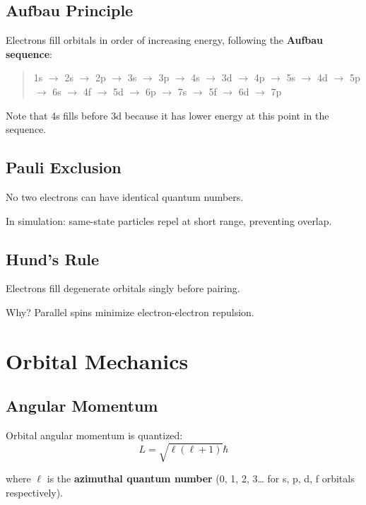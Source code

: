 \documentclass[
  11pt,
  letterpaper,
  twoside,
  openright]{book}
\begin{document}
\subsection{Aufbau Principle}\label{aufbau-principle}

Electrons fill orbitals in order of increasing energy, following the
\textbf{Aufbau sequence}:

\begin{quote}
1s \(\to\) 2s \(\to\) 2p \(\to\) 3s \(\to\) 3p \(\to\) 4s \(\to\) 3d
\(\to\) 4p \(\to\) 5s \(\to\) 4d \(\to\) 5p \(\to\) 6s \(\to\) 4f
\(\to\) 5d \(\to\) 6p \(\to\) 7s \(\to\) 5f \(\to\) 6d \(\to\) 7p
\end{quote}

Note that 4s fills before 3d because it has lower energy at this point
in the sequence.

\subsection{Pauli Exclusion}\label{pauli-exclusion}

No two electrons can have identical quantum numbers.

In simulation: same-state particles repel at short range, preventing
overlap.

\subsection{Hund's Rule}\label{hunds-rule}

Electrons fill degenerate orbitals singly before pairing.

Why? Parallel spins minimize electron-electron repulsion.

\section{Orbital Mechanics}\label{orbital-mechanics}

\subsection{Angular Momentum}\label{angular-momentum}

Orbital angular momentum is quantized: \[
L = \sqrt{\ell(\ell+1)} \hbar
\]

where \(\ell\) is the \textbf{azimuthal quantum number} (0, 1, 2,
3\ldots{} for s, p, d, f orbitals respectively).
\end{document}
